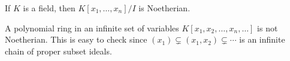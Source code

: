 \begin{xmpl}
If $K$ is a field, then $K[x_1, \dots, x_n] / I$ is Noetherian.
\end{xmpl}

\begin{xmpl}
A polynomial ring in an infinite set of variables
$K[x_1, x_2, \dots, x_n, \dots]$ is not Noetherian. This is easy to
check since $(x_1) \subsetneq (x_1, x_2) \subsetneq \cdots$ is an
infinite chain of proper subset ideals.
\end{xmpl}

